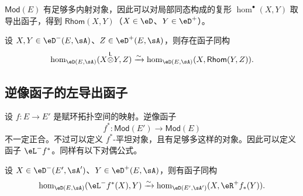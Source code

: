 $\mathsf{Mod}(E)$ 有足够多内射对象，因此可以对局部同态构成的复形 $\hom^\bullet(X,Y)$ 取导出函子，得到 $\mathsf{Rhom}(X,Y)$（$X\in\eD$、$Y\in\eD^+$）。

设 $X,Y\in\eD^-(E,\sA)$、$Z\in\eD^+(E,\sA)$，则存在函子同构
\[
\hom_{\eD(E,\sA)}(X\lotimes Y,Z)
\iso\hom_{\eD(E,\sA)}(X,\mathsf{Rhom}(Y,Z)).
\]
\subsection{逆像函子的左导出函子}\label{VIII:6-3}
设 $f:E\to E'$ 是赋环拓扑空间的映射。逆像函子
\[f^\ast:\mathsf{Mod}(E')\to\mathsf{Mod}(E)\]
不一定正合。不过可以定义 $f^\ast$-平坦对象，且有足够多这样的对象。因此可以定义函子 $\eL^-f^\ast$。同样有以下对偶公式。

设 $X\in\eD^-(E',\sA')$、$Y\in\eD^+(E,\sA)$，则有函子同构
\[
\hom_{\eD(E,\sA)}(\eL^-f^\ast(X),Y)
\iso\hom_{\eD(E',\sA')}(X,\eR^+f_\ast(Y)).
\]

\endgroup
